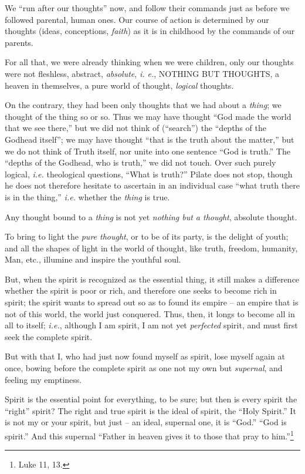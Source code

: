 \documentclass[12pt,a4paper]{book}
\begin{document}
We ``run after our thoughts'' now, and follow their commands just as before 
we followed parental, human ones. Our course of action is determined by our 
thoughts (ideas, conceptions, \textit{faith}) as it is in childhood by the 
commands of our parents.

For all that, we were already thinking when we were children, only our 
thoughts were not fleshless, abstract, \textit{absolute}, \textit{i. e.}, 
NOTHING BUT THOUGHTS, a heaven in themselves, a pure world of thought, 
\textit{logical} thoughts.

On the contrary, they had been only thoughts that we had about a 
\textit{thing}; we thought of the thing so or so. Thus we may have thought 
``God made the world that we see there,'' but we did not think of 
(``search'') the ``depths of the Godhead itself''; we may have thought 
``that is the truth about the matter,'' but we do not think of Truth itself, 
nor unite into one sentence ``God is truth.'' The ``depths of the Godhead, 
who is truth,'' we did not touch. Over such purely logical, \textit{i.e.} 
theological questions, ``What is truth?'' Pilate does not stop, though he 
does not therefore hesitate to ascertain in an individual case ``what truth 
there is in the thing,'' \textit{i.e.} whether the \textit{thing} is true.

Any thought bound to a \textit{thing} is not yet \textit{nothing but a 
thought}, absolute thought.

To bring to light the \textit{pure thought}, or to be of its party, is the 
delight of youth; and all the shapes of light in the world of thought, like 
truth, freedom, humanity, Man, etc., illumine and inspire the youthful soul.

But, when the spirit is recognized as the essential thing, it still makes a 
difference whether the spirit is poor or rich, and therefore one seeks to 
become rich in spirit; the spirit wants to spread out so as to found its 
empire -- an empire that is not of this world, the world just conquered. Thus, 
then, it longs to become all in all to itself; \textit{i.e.}, although I am 
spirit, I am not yet \textit{perfected} spirit, and must first seek the 
complete spirit.

But with that I, who had just now found myself as spirit, lose myself again at 
once, bowing before the complete spirit as one not my own but 
\textit{supernal}, and feeling my emptiness.

Spirit is the essential point for everything, to be sure; but then is every 
spirit the ``right'' spirit? The right and true spirit is the ideal of 
spirit, the ``Holy Spirit.'' It is not my or your spirit, but just -- an 
ideal, supernal one, it is ``God.'' ``God is spirit.'' And this supernal 
``Father in heaven gives it to those that pray to him.''\footnote{Luke 11, 
13.}
\end{document}
